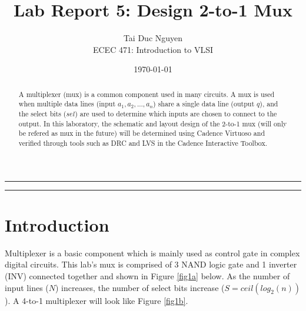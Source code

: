 \documentclass[letterpaper, 11pt]{article}
\title{Lab Report 5: Design 2-to-1 Mux}
\author{
Tai Duc Nguyen \\
ECEC 471: Introduction to VLSI
}
\date{\today}
\begin{document}
\maketitle




\rule{\textwidth}{1pt}

\begin{abstract}
A multiplexer (mux) is a common component used in many circuits. A mux is used when multiple data lines (input $a_1, a_2,...,a_n$) share a single data line (output $q$), and the select bits ($sel$) are used to determine which inputs are chosen to connect to the output. In this laboratory, the schematic and layout design of the 2-to-1 mux (will only be refered as mux in the future) will be determined using Cadence Virtuoso and verified through tools such as DRC and LVS in the Cadence Interactive Toolbox.
\end{abstract}

\rule{\textwidth}{1pt}

\section{Introduction}
\label{sec:intro}

Multiplexer is a basic component which is mainly used as control gate in complex digital circuits. This lab's mux is comprised of 3 NAND logic gate and 1 inverter (INV) connected together and shown in Figure \ref{fig1a} below. As the number of input lines ($N$) increases, the number of select bits increase ($S=ceil(log_2(n))$). A 4-to-1 multiplexer will look like Figure \ref{fig1b}.
\end{document}
